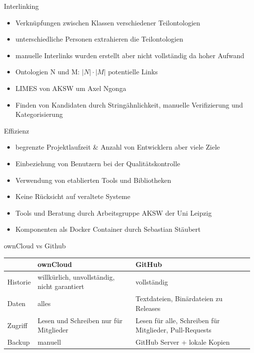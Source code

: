 \documentclass{beamer}
\begin{document}
\begin{frame}{Interlinking}
\begin{itemize}
\item Verknüpfungen zwischen Klassen verschiedener Teilontologien
\item unterschiedliche Personen extrahieren die Teilontologien 
\item manuelle Interlinks wurden erstellt aber nicht vollständig da hoher Aufwand
\item Ontologien N und M: $|N| \cdot |M|$ potentielle Links
\item LIMES von AKSW um Axel Ngonga
\item Finden von Kandidaten durch Stringähnlichkeit, manuelle Verifizierung und Kategorisierung
\end{itemize}
\end{frame}


\begin{frame}{Effizienz}
\begin{itemize}
\item begrenzte Projektlaufzeit \& Anzahl von Entwicklern aber viele Ziele
\item Einbeziehung von Benutzern bei der Qualitätskontrolle 
\item Verwendung von etablierten Tools und Bibliotheken 
\item Keine Rücksicht auf veraltete Systeme
\item Tools und Beratung durch Arbeitsgruppe AKSW der Uni Leipzig
\item Komponenten als Docker Container durch Sebastian Stäubert 
\end{itemize}
\end{frame}



\iffalse
\begin{frame}{ownCloud vs Github}
\begin{tabulary}{\textwidth}{lLL}
\toprule
			&ownCloud					&GitHub\\
\midrule
Historie		&willkürlich, unvollständig, nicht garantiert	&vollständig\\
Daten			&alles						&Textdateien, Binärdateien zu Releases\\
Zugriff			&Lesen und Schreiben nur für Mitglieder		&Lesen für alle, Schreiben für Mitglieder, Pull-Requests\\
Backup			&manuell					&GitHub Server + lokale Kopien\\
\bottomrule
\end{tabulary}
\end{frame}
\end{document}
